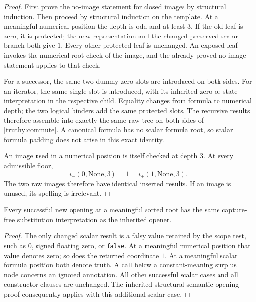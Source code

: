 \begin{proof}
First prove the no-image statement for closed images by structural induction.
Then proceed by structural induction on the template. At a meaningful numerical position
the depth is odd and at least \(3\).  If the old leaf is zero, it is
protected; the new representation and the changed preserved-scalar
branch both give \(1\).  Every other protected leaf is unchanged.
An exposed leaf invokes the numerical-root check of the image, and
the already proved no-image statement applies to that check.

For a successor, the same two dummy zero slots are introduced on both
sides.  For an iterator, the same single slot is introduced, with its
inherited zero or state interpretation in the respective child.
Equality changes from formula to numerical depth; the two logical
binders add the same protected slots.  The recursive results therefore
assemble into exactly the same raw tree on both sides of
\eqref{truthy:commute}.  A canonical formula has no scalar formula
root, so scalar formula padding does not arise in this exact identity.

An image used in a numerical position is itself checked at depth \(3\).
At every admissible floor,
\[
                 i_+(0,\mathrm{None},3)=1
                   =i_+(1,\mathrm{None},3).
\]
The two raw images therefore have identical inserted results.  If an
image is unused, its spelling is irrelevant.
\end{proof}

\begin{lemma}
\label{truthy:semantic}
Every successful new opening at a meaningful sorted root has the same
capture-free substitution interpretation as the inherited opener.
\end{lemma}

\begin{proof}
The only changed scalar result is a falsy value retained by the scope
test, such as \(0\), signed floating zero, or \texttt{false}.
At a meaningful numerical position that value denotes zero; so does
the returned coordinate \(1\).  At a meaningful scalar formula
position both denote truth.  A call below a constant-meaning surplus
node concerns an ignored annotation.  All other successful scalar
cases and all constructor clauses are unchanged.  The inherited
structural semantic-opening proof consequently applies with this
additional scalar case.
\end{proof}

